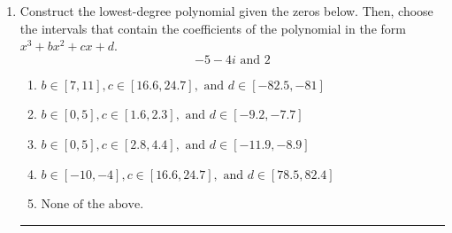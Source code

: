 \documentclass[14pt]{extbook}
\newcommand{\litem}[1]{\item#1\hspace*{-1cm}\rule{\textwidth}{0.4pt}}
\begin{document}
\begin{enumerate}
\litem{
Construct the lowest-degree polynomial given the zeros below. Then, choose the intervals that contain the coefficients of the polynomial in the form $x^3+bx^2+cx+d$.\[ -5 - 4 i \text{ and } 2 \]\begin{enumerate}[label=\Alph*.]
\item \( b \in [7, 11], c \in [16.6, 24.7], \text{ and } d \in [-82.5, -81] \)
\item \( b \in [0, 5], c \in [1.6, 2.3], \text{ and } d \in [-9.2, -7.7] \)
\item \( b \in [0, 5], c \in [2.8, 4.4], \text{ and } d \in [-11.9, -8.9] \)
\item \( b \in [-10, -4], c \in [16.6, 24.7], \text{ and } d \in [78.5, 82.4] \)
\item \( \text{None of the above.} \)


\end{enumerate}}
\end{enumerate}
\end{document}

